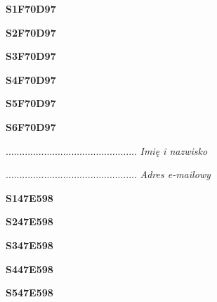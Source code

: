 \begin{turn}{90}\huge \textbf{S1F70D97}\end{turn}

\begin{turn}{90}\huge \textbf{S2F70D97}\end{turn}

\begin{turn}{90}\huge \textbf{S3F70D97}\end{turn}

\begin{turn}{90}\huge \textbf{S4F70D97}\end{turn}

\begin{turn}{90}\huge \textbf{S5F70D97}\end{turn}

\begin{turn}{90}\huge \textbf{S6F70D97}\end{turn}

\begin{turn}{90}\begin{minipage}{\linewidth} \vspace{20mm} ................................................  \textit{Imię i nazwisko}\end{minipage}\end{turn}

\begin{turn}{90}\begin{minipage}{\linewidth} \vspace{20mm} ................................................  \textit{Adres e-mailowy}\end{minipage}\end{turn}

\begin{turn}{90}\huge \textbf{S147E598}\end{turn}

\begin{turn}{90}\huge \textbf{S247E598}\end{turn}

\begin{turn}{90}\huge \textbf{S347E598}\end{turn}

\begin{turn}{90}\huge \textbf{S447E598}\end{turn}

\begin{turn}{90}\huge \textbf{S547E598}\end{turn}

